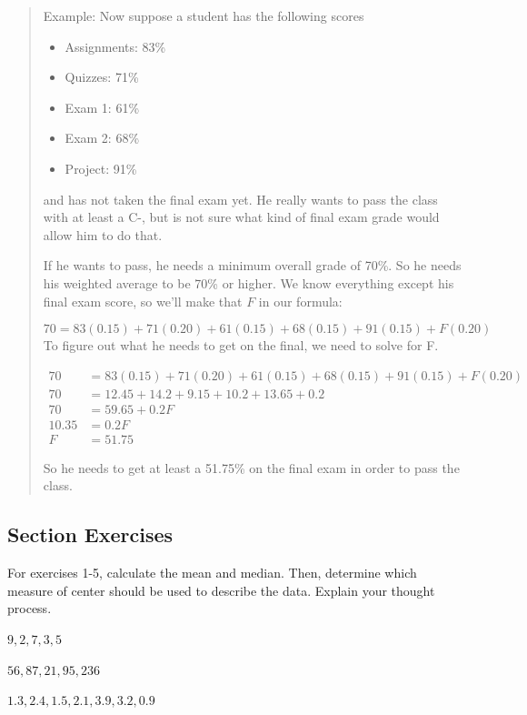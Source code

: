 \documentclass[
]{book}
\providecommand{\tightlist}{%
  \setlength{\itemsep}{0pt}\setlength{\parskip}{0pt}}
\begin{document}
\begin{quote}
Example: Now suppose a student has the following scores

\begin{itemize}
\tightlist
\item
  Assignments: 83\%
\item
  Quizzes: 71\%
\item
  Exam 1: 61\%
\item
  Exam 2: 68\%
\item
  Project: 91\%
\end{itemize}

and has not taken the final exam yet. He really wants to pass the class with at least a C-, but is not sure what kind of final exam grade would allow him to do that.

If he wants to pass, he needs a minimum overall grade of 70\%. So he needs his weighted average to be 70\% or higher. We know everything except his final exam score, so we'll make that \(F\) in our formula:

\[70 = 83(0.15) + 71(0.20) + 61(0.15) + 68(0.15) + 91(0.15) + F(0.20)\]
To figure out what he needs to get on the final, we need to solve for F.

\[\begin{aligned}
70 &= 83(0.15) + 71(0.20) + 61(0.15) + 68(0.15) + 91(0.15) + F(0.20)\\
70 &= 12.45+14.2+9.15+10.2+13.65+0.2 \\
70  &= 59.65 + 0.2F \\
10.35 &= 0.2F \\
F &= 51.75
\end{aligned}\]

So he needs to get at least a 51.75\% on the final exam in order to pass the class.
\end{quote}

\subsection*{Section Exercises}\label{section-exercises-4}

For exercises 1-5, calculate the mean and median. Then, determine which measure of center should be used to describe the data. Explain your thought process.

\(9,2,7,3,5\)

\(56,87,21,95,236\)

\(1.3, 2.4, 1.5, 2.1, 3.9, 3.2, 0.9\)
\end{document}
